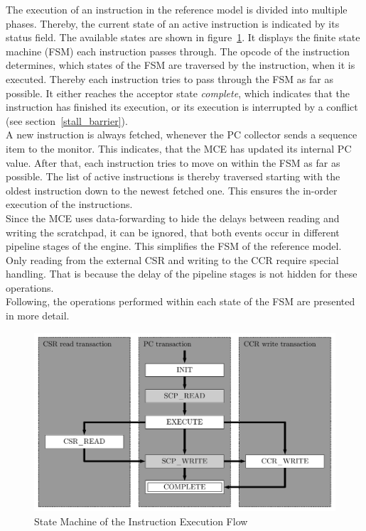 The execution of an instruction in the reference model is divided into multiple phases.
Thereby, the current state of an active instruction is indicated by its status field.
The available states are shown in figure~\ref{fig:ref_model_phases}.
It displays the finite state machine (FSM) each instruction passes through.
The opcode of the instruction determines, which states of the FSM are traversed by the instruction, when it is executed.
Thereby each instruction tries to pass through the FSM as far as possible.
It either reaches the acceptor state \emph{complete}, which indicates that the instruction has finished its execution, or its execution is interrupted by a
conflict (see section~\ref{stall_barrier}).\\
A new instruction is always fetched, whenever the PC collector sends a sequence item to the monitor.
This indicates, that the MCE has updated its internal PC value.
After that, each instruction tries to move on within the FSM as far as possible.
The list of active instructions is thereby traversed starting with the oldest instruction down to the newest fetched one.
This ensures the in-order execution of the instructions.\\
Since the MCE uses data-forwarding to hide the delays between reading and writing the scratchpad, it can be ignored, that both events occur in different
pipeline stages of the engine.
This simplifies the FSM of the reference model.
Only reading from the external CSR and writing to the CCR require special handling.
That is because the delay of the pipeline stages is not hidden for these operations.\\
Following, the operations performed within each state of the FSM are presented in more detail.

\begin{figure}[htb]
 \centering
 \includegraphics[width=1.0\textwidth,angle=0]{images/ref_model_phases}
 \caption{State Machine of the Instruction Execution Flow}
\label{fig:ref_model_phases}
\end{figure}

